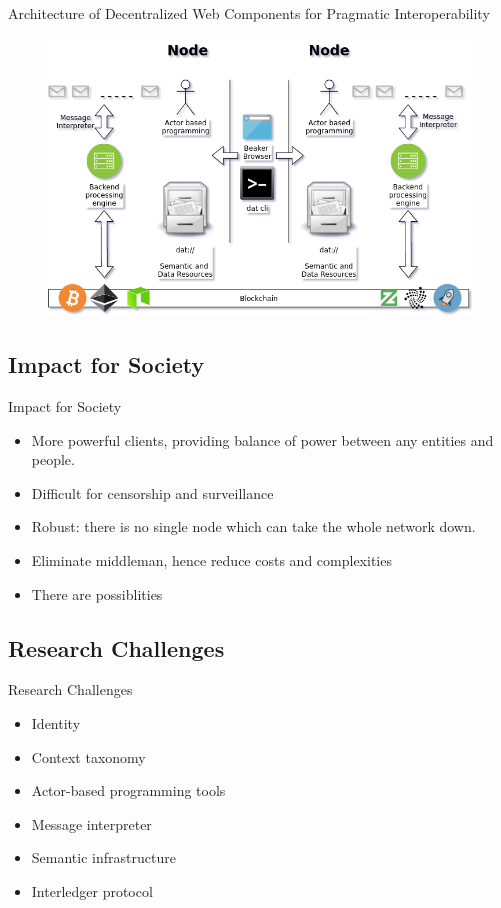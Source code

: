 \documentclass[10pt]{beamer}
\begin{document}
    \begin{frame}[fragile]{Architecture of Decentralized Web Components for Pragmatic Interoperability}

      \begin{figure}[h]
      \includegraphics[scale=0.4]{decweb-pragmatic-int}
      \end{figure}

    \end{frame}

  \subsection{Impact for Society}

    \begin{frame}[fragile]{Impact for Society}
      \begin{itemize}
        \item More powerful clients, providing balance of power between any entities and people.
        \item Difficult for censorship and surveillance
        \item Robust: there is no single node which can take the whole network down.
        \item Eliminate middleman, hence reduce costs and complexities
        \item There are possiblities 
      \end{itemize}
    \end{frame}

  \subsection{Research Challenges}

    \begin{frame}[fragile]{Research Challenges}
      \begin{itemize}
        \item Identity
        \item Context taxonomy
        \item Actor-based programming tools
        \item Message interpreter
        \item Semantic infrastructure
        \item Interledger protocol
      \end{itemize}
    \end{frame}
\end{document}
